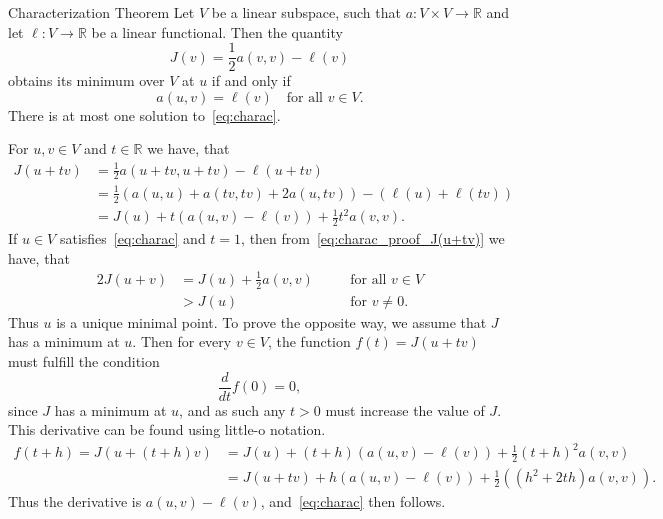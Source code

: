 
\begin{thmx}{Characterization Theorem}
    Let $V$ be a linear subspace, such that
        \(
            a: V \times V \rightarrow \mathbb{R}
        \) and
     let
        \(
            \ell: V \rightarrow \mathbb{R}
        \)
    be a linear functional. Then the quantity
        \[
            J(v)=\frac{1}{2} a(v,v) - \ell(v)
        \]
    obtains its minimum over $V$ at $u$ if and only if
        \begin{equation}
            a(u,v) = \ell(v) \quad \text{for all } v \in V.
        \label{eq:charac}
        \end{equation}
    There is at most one solution to~\eqref{eq:charac}.\label{thm:charac_theorem}
\end{thmx}

\begin{bev}
    For $u,v \in V$ and $t \in \mathbb{R}$ we have, that
    \begin{align}
        J(u+tv) &= \frac{1}{2} a(u+tv,u+tv) - \ell(u+tv) \nonumber \\
        &= \frac{1}{2} \left( a(u,u) + a(tv,tv) + 2a(u,tv) \right) - \left(  \ell(u) + \ell(tv)\right) \nonumber \\
        &= J(u) + t\left( a(u,v) - \ell(v) \right) + \frac{1}{2}t^2a(v,v). \label{eq:charac_proof_J(u+tv)}
    \end{align}
    If $u \in V$ satisfies~\eqref{eq:charac} and $t=1$, then from~\eqref{eq:charac_proof_J(u+tv)} we have, that
    \begin{alignat}{2}
        J(u+v) &= J(u) + \frac{1}{2}a(v,v) \quad &&\text{for all } v\in V  \nonumber \\
        &> J(u) \quad &&\text{for } v \neq 0.
    \end{alignat}
    Thus $u$ is a unique minimal point. 
    To prove the opposite way, we assume that $J$ has a minimum at $u$.
    Then for every $v\in V$, the function $f(t)= J(u+tv)$ must fulfill the condition
    \begin{equation*}
        \frac{d}{dt}f(0) = 0,
    \end{equation*}
    since $J$ has a minimum at $u$, and as such any $t>0$ must increase the 
    value of $J$.
    This derivative can be found using little-o notation.
    \begin{align*}
          f(t+h) = J(u+(t+h)v) &= J(u) + (t+h) (a(u,v) - \ell(v)) + \frac{1}{2}{(t+h)}^2 a(v,v) \\
          &= J(u+tv) + h(a(u,v) - \ell(v)) + \frac{1}{2}((h^2+2th)a(v,v)).
    \end{align*}
    Thus the derivative is $a(u,v) - \ell(v)$, and~\eqref{eq:charac} then follows.
\end{bev}